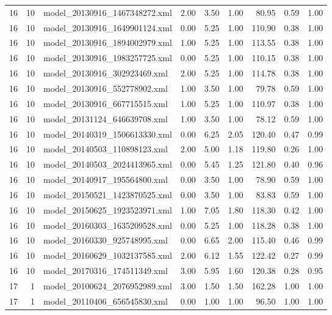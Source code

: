\begin{table}[ht]
\begin{tabular}{rrlrrrrrr}
   16 &  10 & model\_20130916\_1467348272.xml & 2.00 & 3.50 & 1.00 & 80.95 & 0.59 & 1.00 \\ 
   16 &  10 & model\_20130916\_1649901124.xml & 0.00 & 5.25 & 1.00 & 110.90 & 0.38 & 1.00 \\ 
   16 &  10 & model\_20130916\_1894002979.xml & 1.00 & 5.25 & 1.00 & 113.55 & 0.38 & 1.00 \\ 
   16 &  10 & model\_20130916\_1983257725.xml & 0.00 & 5.25 & 1.00 & 110.15 & 0.38 & 1.00 \\ 
   16 &  10 & model\_20130916\_302923469.xml & 2.00 & 5.25 & 1.00 & 114.78 & 0.38 & 1.00 \\ 
   16 &  10 & model\_20130916\_552778902.xml & 1.00 & 3.50 & 1.00 & 79.78 & 0.59 & 1.00 \\ 
   16 &  10 & model\_20130916\_667715515.xml & 1.00 & 5.25 & 1.00 & 110.97 & 0.38 & 1.00 \\ 
   16 &  10 & model\_20131124\_646639708.xml & 1.00 & 3.50 & 1.00 & 78.12 & 0.59 & 1.00 \\ 
   16 &  10 & model\_20140319\_1506613330.xml & 0.00 & 6.25 & 2.05 & 120.40 & 0.47 & 0.99 \\ 
   16 &  10 & model\_20140503\_110898123.xml & 2.00 & 5.00 & 1.18 & 119.80 & 0.26 & 1.00 \\ 
   16 &  10 & model\_20140503\_2024413965.xml & 0.00 & 5.45 & 1.25 & 121.80 & 0.40 & 0.96 \\ 
   16 &  10 & model\_20140917\_195564800.xml & 0.00 & 3.50 & 1.00 & 78.90 & 0.59 & 1.00 \\ 
   16 &  10 & model\_20150521\_1423870525.xml & 0.00 & 3.50 & 1.00 & 83.83 & 0.59 & 1.00 \\ 
   16 &  10 & model\_20150625\_1923523971.xml & 1.00 & 7.05 & 1.80 & 118.30 & 0.42 & 1.00 \\ 
   16 &  10 & model\_20160303\_1635209528.xml & 0.00 & 5.25 & 1.00 & 118.28 & 0.38 & 1.00 \\ 
   16 &  10 & model\_20160330\_925748995.xml & 0.00 & 6.65 & 2.00 & 115.40 & 0.46 & 0.99 \\ 
   16 &  10 & model\_20160629\_1032137585.xml & 2.00 & 6.12 & 1.55 & 122.42 & 0.27 & 0.99 \\ 
   16 &  10 & model\_20170316\_174511349.xml & 3.00 & 5.95 & 1.60 & 120.38 & 0.28 & 0.95 \\ 
   17 &   1 & model\_20100624\_2076952989.xml & 3.00 & 1.50 & 1.50 & 162.28 & 1.00 & 1.00 \\ 
   17 &   1 & model\_20110406\_656545830.xml & 0.00 & 1.00 & 1.00 & 96.50 & 1.00 & 1.00 \\ 

\end{tabular}
\end{table}
